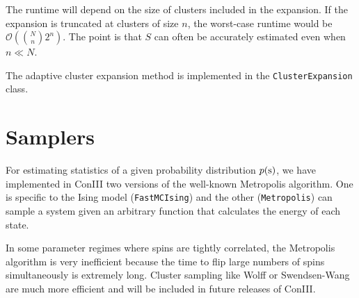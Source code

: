 \documentclass[aps,prl,twocolumn,nofootinbib]{revtex4-1}
\begin{document}
The runtime will depend on the size of clusters included in the expansion.
If the expansion is truncated at clusters of size $n$, the worst-case runtime
would be $\mathcal{O}\left(\binom{N}{n} 2^n\right)$.  The point is that $S$ can often
be accurately estimated even when $n \ll N$.

The adaptive cluster expansion method is implemented in the {\tt ClusterExpansion} class.






\section{Samplers}
For estimating statistics of a given probability distribution $p({\rm s})$, we have implemented in ConIII two versions of the well-known Metropolis algorithm. One is specific to the Ising model ({\tt FastMCIsing}) and the other ({\tt Metropolis}) can sample a system given an arbitrary function that calculates the energy of each state.

In some parameter regimes where spins are tightly correlated, the Metropolis algorithm is very inefficient because the time to flip large numbers of spins simultaneously is extremely long. Cluster sampling like Wolff or Swendsen-Wang are much more efficient and will be included in future releases of ConIII.
\end{document}
